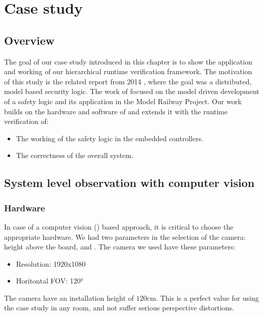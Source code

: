 \chapter{Case study}
\label{chap:case_study}

\section{Overview}

The goal of our case study introduced in this chapter is to show the application and working of our hierarchical runtime verification framework. The motivation of this study is the related report from 2014 \citep{tdk2014}, where the goal was a distributed, model based security logic. The work of \citep{tdk2014} focused on the model driven development of a safety logic and its application in the Model Railway Project. Our work builds on the hardware and software of \citep{tdk2014} and extends it with the runtime verification of:
\begin{itemize}
	\item The working of the safety logic in the embedded controllers.
	\item The correctness of the overall system.
\end{itemize}

\section{System level observation with computer vision}

\subsection{Hardware}
\label{sec:case_study:hardware}

In case of a computer vision () based approach, it is critical to choose the appropriate hardware. We had two parameters in the selection of the camera: height above the board, and . The camera we used have these parameters:
\begin{itemize}
	\item Resolution: 1920x1080
	\item Horitontal FOV: \ang{120}
\end{itemize}

The camera have an installation height of $120$\si{\centi\meter}. This is a perfect value for using the case study in any room, and not suffer serious perspective distortions.

